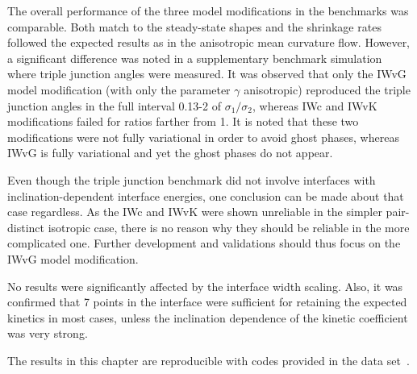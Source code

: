 The overall performance of the three model modifications in the benchmarks was comparable. Both match to the steady-state shapes and the shrinkage rates followed the expected results as in the anisotropic mean curvature flow. However, a significant difference was noted in a supplementary benchmark simulation where triple junction angles were measured. It was observed that only the IWvG model modification (with only the parameter $\gamma$ anisotropic) reproduced the triple junction angles in the full interval 0.13-2 of $\sigma_1/\sigma_2$, whereas IWc and IWvK modifications failed for ratios farther from 1. It is noted that these two modifications were not fully variational in order to avoid ghost phases, whereas IWvG is fully variational and yet the ghost phases do not appear.

Even though the triple junction benchmark did not involve interfaces with inclination-dependent interface energies, one conclusion can be made about that case regardless. As the IWc and IWvK were shown unreliable in the simpler pair-distinct isotropic case, there is no reason why they should be reliable in the more complicated one. Further development and validations should thus focus on the IWvG model modification.


No results were significantly affected by the interface width scaling. Also, it was confirmed that 7 points in the interface were sufficient for retaining the expected kinetics in most cases, unless the inclination dependence of the kinetic coefficient was very strong.

The results in this chapter are reproducible with codes provided in the data set~\cite{Minar2022dataset}.
	
	
	

